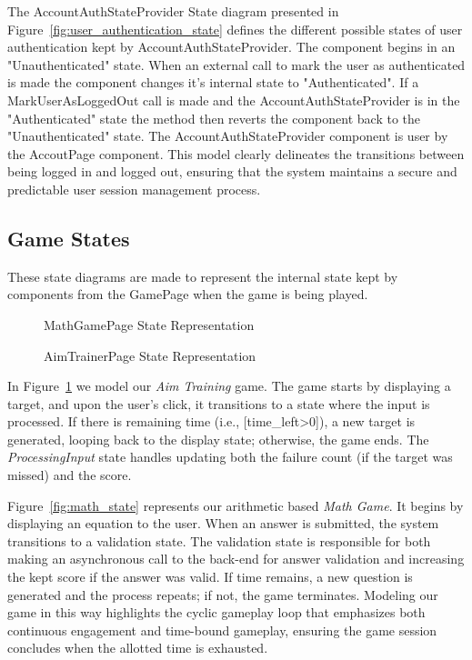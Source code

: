 \documentclass[11pt,a4paper]{article}
\newcommand{\inputdiagram}[1]{}
\newcommand{\textwidthdiagram}[2][1]{%
  \resizebox{#1\textwidth}{!}{\inputdiagram{#2}}%
}
\begin{document}
The AccountAuthStateProvider State diagram presented in
Figure~\ref{fig:user_authentication_state} defines the different possible
states of user authentication kept by AccountAuthStateProvider. The
component begins in an "Unauthenticated" state. When an external call
to mark the user as authenticated is made the component changes it's
internal state to "Authenticated". If a MarkUserAsLoggedOut call is made
and the AccountAuthStateProvider is in the "Authenticated" state the
method then reverts the component back to the "Unauthenticated" state. The
AccountAuthStateProvider component is user by the AccoutPage component. This
model clearly delineates the transitions between being logged in and logged
out, ensuring that the system maintains a secure and predictable user session
management process.

\subsection{Game States}

These state diagrams are made to represent the internal state kept by
components from the GamePage when the game is being played.

\begin{figure}[H]
    \centering
    \begin{minipage}[b]{0.48\textwidth}
        \centering
        \textwidthdiagram{math_state.tex}
        \caption{MathGamePage State Representation}
        \label{fig:math_state}
    \end{minipage}
    \hfil
    \begin{minipage}[b]{0.48\textwidth}
        \centering
        \textwidthdiagram{aim_trainer_state.tex}
        \caption{AimTrainerPage State Representation}
        \label{fig:aim_trainer_state}
    \end{minipage}
\end{figure}

In Figure~\ref{fig:aim_trainer_state} we model our \textit{Aim Training} game. The
game starts by displaying a target, and upon the user's click, it transitions
to a state where the input is processed. If there is remaining time (i.e.,
[time\_left>0]), a new target is generated, looping back to the display state;
otherwise, the game ends. The \textit{ProcessingInput} state handles updating both
the failure count (if the target was missed) and the score.

Figure~\ref{fig:math_state} represents our arithmetic based \textit{Math Game}. It
begins by displaying an equation to the user. When an answer is submitted, the
system transitions to a validation state. The validation state is responsible
for both making an asynchronous call to the back-end for answer validation
and increasing the kept score if the answer was valid. If time remains,
a new question is generated and the process repeats; if not, the game
terminates. Modeling our game in this way highlights the cyclic gameplay
loop that emphasizes both continuous engagement and time-bound gameplay,
ensuring the game session concludes when the allotted time is exhausted.
\end{document}
